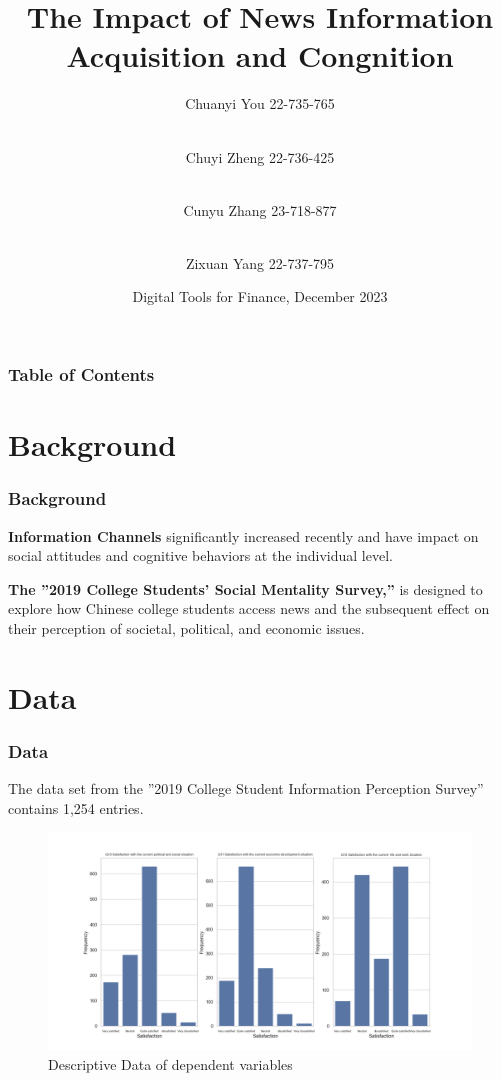 \documentclass{beamer}
\title[Digital Tools For Finance] %
{The Impact of News Information Acquisition and Congnition}
\author[Banking and Finance] %
{Chuanyi You 22-735-765\and \\
Chuyi Zheng 22-736-425\and \\
Cunyu Zhang 23-718-877\and\\
Zixuan Yang 22-737-795}
\date[December 2023] %
{Digital Tools for Finance, December 2023}
\begin{document}
\frame{\titlepage}


\begin{frame}
\frametitle{Table of Contents}
\tableofcontents
\end{frame}


\section{Background}


\begin{frame}
\frametitle{Background}
\textbf{Information Channels} significantly increased recently and have impact on social attitudes and cognitive behaviors at the individual level.


\vspace{12pt}
\textbf{The ”2019 College Students’ Social Mentality Survey,” }is designed to explore how Chinese college students access news and the subsequent effect on their perception of societal, political, and economic issues.
\end{frame}


\section{Data}

\begin{frame}
\frametitle{Data}
The data set from the ”2019 College Student Information Perception Survey” contains 1,254 entries.
\begin{figure}
  \centering
  \includegraphics[width=0.8\linewidth]{Distribution.jpg}
  \caption{Descriptive Data of dependent variables}
  \label{fig:Distribution}
\end{figure}
\end{frame}
\end{document}
